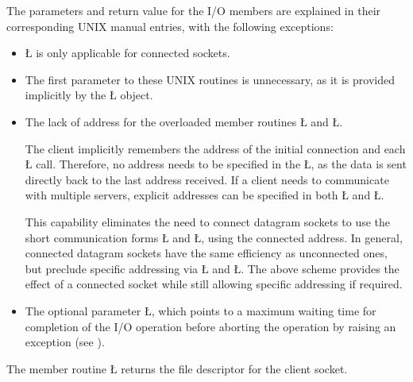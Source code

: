 \documentclass[openright,twoside]{report}
\begin{document}
The parameters and return value for the I/O members are explained in their corresponding UNIX manual entries, with the following exceptions:
\begin{itemize}
\item
\LGinlinetrue\LGbegin\lgrinde\L{}\endlgrinde\LGend{} is only applicable for connected sockets.
\item
The first parameter to these UNIX routines is unnecessary, as it is provided implicitly by the \LGinlinetrue\LGbegin\lgrinde\L{}\endlgrinde\LGend{} object.
\item
The lack of address for the overloaded member routines \LGinlinetrue\LGbegin\lgrinde\L{}\endlgrinde\LGend{} and \LGinlinetrue\LGbegin\lgrinde\L{}\endlgrinde\LGend{}.

The client implicitly remembers the address of the initial connection and each \LGinlinetrue\LGbegin\lgrinde\L{}\endlgrinde\LGend{} call.
Therefore, no address needs to be specified in the \LGinlinetrue\LGbegin\lgrinde\L{}\endlgrinde\LGend{}, as the data is sent directly back to the last address received.
If a client needs to communicate with multiple servers, explicit addresses can be specified in both \LGinlinetrue\LGbegin\lgrinde\L{}\endlgrinde\LGend{} and \LGinlinetrue\LGbegin\lgrinde\L{}\endlgrinde\LGend{}.

This capability eliminates the need to connect datagram sockets to use the short communication forms \LGinlinetrue\LGbegin\lgrinde\L{}\endlgrinde\LGend{} and \LGinlinetrue\LGbegin\lgrinde\L{}\endlgrinde\LGend{}, using the connected address.
In general, connected datagram sockets have the same efficiency as unconnected ones, but preclude specific addressing via \LGinlinetrue\LGbegin\lgrinde\L{}\endlgrinde\LGend{} and \LGinlinetrue\LGbegin\lgrinde\L{}\endlgrinde\LGend{}.
The above scheme provides the effect of a connected socket while still allowing specific addressing if required.
\item
The optional parameter \LGinlinetrue\LGbegin\lgrinde\L{}\endlgrinde\LGend{}, which points to a maximum waiting time for completion of the I/O operation before aborting the operation by raising an exception (see ).
\end{itemize}

The member routine \LGinlinetrue\LGbegin\lgrinde\L{}\endlgrinde\LGend{} returns the file descriptor for the client socket.
\end{document}

